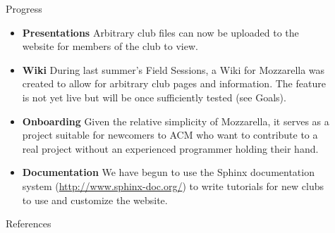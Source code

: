 \documentclass[final]{beamer}
\newlength{\sepwid}
\newlength{\onecolwid}
\begin{document}
\begin{frame}[t]
\begin{columns}[t]
\begin{column}{\onecolwid}
            \end{column} %

            \begin{column}{\sepwid}\end{column} %

            \begin{column}{\onecolwid} %

                \begin{block}{Progress}
                    \setlength{\parskip}{0.5em}

		    \begin{itemize}
			\item \textbf{Presentations} Arbitrary club files can
                        now be uploaded to the website for members of the club
                        to view.
			\item \textbf{Wiki} During last summer's Field Sessions,
                        a Wiki for Mozzarella was created to allow for arbitrary
                        club pages and information. The feature is not yet live
                        but will be once sufficiently tested (see Goals).
			\item \textbf{Onboarding} Given the relative simplicity
                        of Mozzarella, it serves as a project suitable for
                        newcomers to ACM who want to contribute to a real
                        project without an experienced programmer holding their
                        hand.
			\item \textbf{Documentation} We have begun to use the
                        Sphinx documentation system
                        (\href{http://www.sphinx-doc.org/}{http://www.sphinx-doc.org/})
                        to write tutorials for new clubs to use and customize
                        the website.
		    \end{itemize}

                \end{block}

                \begin{block}{References}
                    \printbibliography
                \end{block}



\end{column}
\end{columns}
\end{frame}
\end{document}
